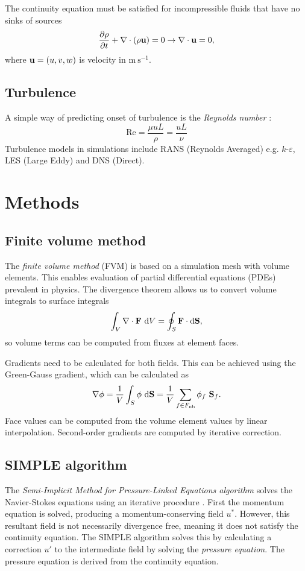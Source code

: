\documentclass[12pt]{article}
\newcommand{\D}{\text{d}}
\newcommand{\un}[1]{ \text{#1}}
\newcommand{\up}[2]{\text{#1}^{#2}} %
\newcommand{\vb}[1]{\text{\textbf{#1}}}
\newcommand{\x}{\text}
\newcommand{\fnb}{F_{\x{nb}}}
\begin{document}
The continuity equation must be satisfied for incompressible fluids that have no sinks of sources
\begin{equation}
  \frac{\partial \rho}{\partial t} + \nabla \cdot (\rho \vb u) = 0 \rightarrow \nabla \cdot \vb u = 0,
\end{equation}
where $\vb u = (u, v, w)$ is velocity in $\un{m} \ \up{s}{-1}$.

\subsection{Turbulence}

A simple way of predicting onset of turbulence is the \textit{Reynolds number} \cite{tri}:
$$
\text{Re} = \frac{\mu u L}{\rho} = \frac{u L}{\nu}
$$
Turbulence models in simulations include RANS (Reynolds Averaged) e.g. $k$-$\varepsilon$, LES (Large Eddy) and DNS (Direct).

\section{Methods}

\subsection{Finite volume method}

The \textit{finite volume method} (FVM) is based on a simulation mesh with volume elements. This enables evaluation of partial differential equations (PDEs) prevalent in physics. The divergence theorem allows us to convert volume integrals to surface integrals
$$
\int_V \nabla \cdot \vb F \ \D V = \oint_S \vb F \cdot \D \vb S,
$$
so volume terms can be computed from fluxes at element faces.

Gradients need to be calculated for both fields. This can be achieved using the Green-Gauss gradient, which can be calculated as
$$
\nabla \phi = \frac{1}{V} \int_S \phi \ \D \vb S = \frac{1}{V} \sum_{f \in \fnb} \phi_f \ \vb S_f.
$$
Face values can be computed from the volume element values by linear interpolation. Second-order gradients are computed by iterative correction.

\subsection{SIMPLE algorithm}

The \textit{Semi-Implicit Method for Pressure-Linked Equations algorithm} solves the Navier-Stokes equations using an iterative procedure \cite{pat}. First the momentum equation is solved, producing a momentum-conserving field $u^*$. However, this resultant field is not necessarily divergence free, meaning it does not satisfy the continuity equation. The SIMPLE algorithm solves this by calculating a correction $u'$ to the intermediate field by solving the \textit{pressure equation}. The pressure equation is derived from the continuity equation.
\end{document}
